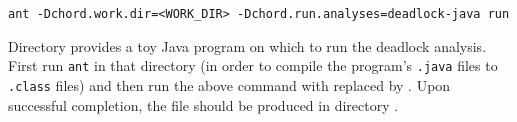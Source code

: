 \begin{framed}
\begin{verbatim}
ant -Dchord.work.dir=<WORK_DIR> -Dchord.run.analyses=deadlock-java run
\end{verbatim}
\end{framed}

Directory  provides a toy Java program on which to
run the deadlock analysis.  First run {\tt ant} in that directory (in order to
compile the program's {\tt .java} files to {\tt .class} files) and then run the
above command with  replaced by .
Upon successful completion, the file  should be produced in
directory .

